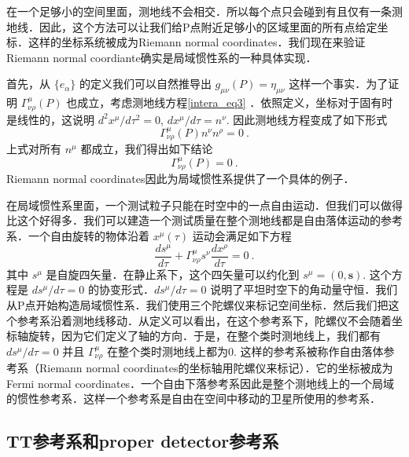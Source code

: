 在一个足够小的空间里面，测地线不会相交．所以每个点只会碰到有且仅有一条测地线．因此，这个方法可以让我们给P点附近足够小的区域里面的所有点给定坐标．这样的坐标系统被成为Riemann normal coordinates．我们现在来验证Riemann normal coordiante确实是局域惯性系的一种具体实现．

首先，从 $\{e_{\alpha}\}$ 的定义我们可以自然推导出 $g_{\mu\nu}(P) = \eta_{\mu\nu}$ 这样一个事实．为了证明 $\Gamma^\mu_{\nu\rho}(P)$ 也成立，考虑测地线方程\autoref{intera_eq3} ．依照定义，坐标对于固有时是线性的，这说明 $d^2 x^\mu/d \tau^2 = 0$, $dx^\mu/d\tau = n^\nu$. 因此测地线方程变成了如下形式
\begin{equation}
\Gamma^\mu_{\nu\rho} (P) n^\nu n^\rho = 0 ~.
\end{equation}
上式对所有 $n^\mu$ 都成立，我们得出如下结论
\begin{equation}
\Gamma^\mu_{\nu\rho} (P) = 0~.
\end{equation}
Riemann normal coordinates因此为局域惯性系提供了一个具体的例子．

在局域惯性系里面，一个测试粒子只能在时空中的一点自由运动．但我们可以做得比这个好得多．我们可以建造一个测试质量在整个测地线都是自由落体运动的参考系．一个自由旋转的物体沿着 $x^\mu(\tau)$ 运动会满足如下方程
\begin{equation}
\frac{ds^\mu}{d\tau} + \Gamma^\mu_{\nu\rho} s^\nu \frac{dx^\rho}{d\tau} = 0~.
\end{equation}
其中 $s^\mu$ 是自旋四矢量．在静止系下，这个四矢量可以约化到 $s^\mu = (0,\mathbf s)$. 这个方程是 $ds^\mu/d\tau=0$ 的协变形式．$ds^\mu/d\tau=0$ 说明了平坦时空下的角动量守恒．我们从P点开始构造局域惯性系．我们使用三个陀螺仪来标记空间坐标．然后我们把这个参考系沿着测地线移动．从定义可以看出，在这个参考系下，陀螺仪不会随着坐标轴旋转，因为它们定义了轴的方向．于是，在整个类时测地线上，我们都有 $ds^\mu/d\tau = 0$ 并且 $\Gamma^\mu_{\nu\rho}$ 在整个类时测地线上都为0. 这样的参考系被称作自由落体参考系（Riemann normal coordinates的坐标轴用陀螺仪来标记）．它的坐标被成为Fermi normal coordinates．一个自由下落参考系因此是整个测地线上的一个局域的惯性参考系．这样一个参考系是自由在空间中移动的卫星所使用的参考系．

\subsection{TT参考系和proper detector参考系}
